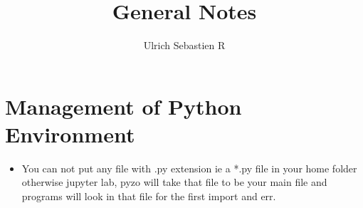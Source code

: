 \documentclass{article}
\author{Ulrich Sebastien R}
\title{\Large{\textbf{General Notes}}}
\begin{document}
\maketitle

\section{Management of Python Environment}
\begin{itemize}
\item You can not put any file with .py extension ie a *.py file in your home folder otherwise jupyter lab, pyzo will take that file to be your main file and programs will look in that file for the first import and err.
\end{itemize}
\end{document}
